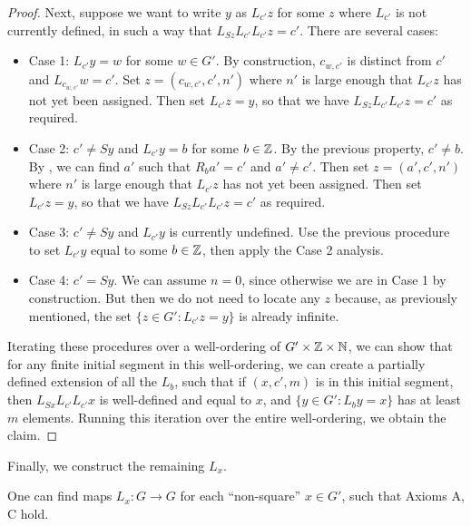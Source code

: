 \begin{proof}
Next, suppose we want to write $y$ as $L_{c'} z$ for some $z$ where $L_{c'}$ is not currently defined, in such a way that $L_{Sz} L_{c'} L_{c'} z = c'$.  There are several cases:
\begin{itemize}
\item Case 1: $L_{c'} y = w$ for some $w \in G'$.  By construction, $c_{w,c'}$ is distinct from $c'$ and $L_{c_{w,c'}} w = c'$.  Set $z = (c_{w,c'}, c', n')$ where $n'$ is large enough that $L_{c'} z$ has not yet been assigned.  Then set $L_{c'} z = y$, so that we have $L_{Sz} L_{c'} L_{c'} z = c'$ as required.
\item Case 2: $c' \neq Sy$ and $L_{c'} y = b$ for some $b \in \mathbb{Z}$. By the previous property, $c' \neq b$.  By , we can find $a'$ such that $R_b a' = c'$ and $a' \neq c'$.  Then set $z = (a', c', n')$ where $n'$ is large enough that $L_{c'} z$ has not yet been assigned.  Then set $L_{c'} z = y$, so that we have $L_{Sz} L_{c'} L_{c'} z = c'$ as required.
\item Case 3: $c' \neq Sy$ and $L_{c'} y$ is currently undefined.  Use the previous procedure to set $L_{c'} y$ equal to some $b \in \mathbb{Z}$, then apply the Case 2 analysis.
\item Case 4: $c' = Sy$.  We can assume $n=0$, since otherwise we are in Case 1 by construction.  But then we do not need to locate any $z$ because, as previously mentioned, the set $\{ z \in G': L_{c'} z = y \}$ is already infinite.
\end{itemize}

Iterating these procedures over a well-ordering of $G' \times \mathbb{Z} \times \mathbb{N}$, we can show that for any finite initial segment in this well-ordering, we can create a partially defined extension of all the $L_b$, such that if $(x,c',m)$ is in this initial segment, then $L_{Sx} L_{c'} L_{c'} x$ is well-defined and equal to $x$,  and $\{ y \in G': L_b y = x \}$ has at least $m$ elements.  Running this iteration over the entire well-ordering, we obtain the claim.
\end{proof}

Finally, we construct the remaining $L_x$.

\begin{proposition}\label{axiom-c} One can find maps $L_x: G \to G$ for each ``non-square'' $x \in G'$, such that Axioms A, C hold.
\end{proposition}

